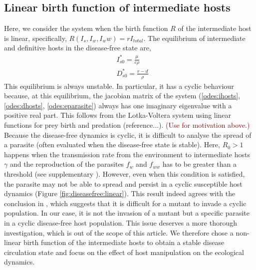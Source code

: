 \documentclass[11pt]{article}
\newcommand{\cha}[1]{\textcolor{darkred}{(#1)}}
\begin{document}
\subsection*{Linear birth function of intermediate hosts}
Here, we consider the system when the birth function $R$ of the intermediate host is linear, specifically, $R(I_s, I_w, I_ww) = r I_{total}$. 
The equilibrium of intermediate and definitive hosts in the disease-free state are,
%
\begin{align*}
& I_{s0}^* = \frac{\mu}{c \rho} \\
& D_{s0}^* = \frac{r - d}{\rho}
\end{align*}
%
This equilibrium is always unstable. 
In particular, it has a cyclic behaviour because, at this equilibrium, the jacobian matrix of the system (\ref{odes:ihosts}, \ref{odes:dhosts}, \ref{odes:eparasite}) always has one imaginary eigenvalue with a positive real part. 
This follows from the Lotka-Voltera system using linear functions for prey birth and predation (reference...). \cha{Use for motivation above.}
Because the disease-free dynamics is cyclic, it is difficult to analyse the spread of a parasite (often evaluated when the disease-free state is stable). 
Here,  $R_0 > 1$  happens when the transmission rate from the environment to intermediate hosts $\gamma$ and the reproduction of the parasites $f_w$ and $f_{ww}$ has to be greater than a threshold (see supplementary ). 
However, even when this condition is satisfied, the parasite may not be able to spread and persist in a cyclic susceptible host dynamics (Figure \ref{fig:diseasefree:linear}). This result indeed agrees with the conclusion in \cite{Ripa:Evol:2013}, which suggests that it is difficult for a mutant to invade a cyclic population. 
In our case, it is not the invasion of a mutant but a specific parasite in a cyclic disease-free host population. 
This issue deserves a more thorough investigation, which is out of the scope of this article. 
We therefore chose a non-linear birth function of the intermediate hosts to obtain a stable disease circulation state and focus on the effect of host manipulation on the ecological dynamics. 
\end{document}
